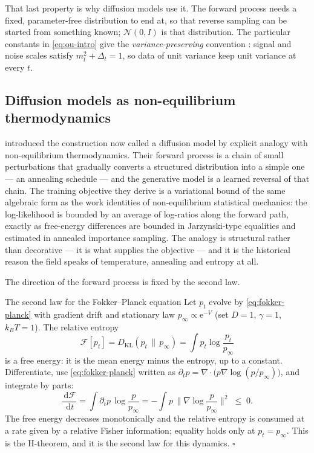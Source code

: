 \documentclass[11pt,a4paper]{article}
\newcommand{\N}{\mathcal{N}}
\newcommand{\KL}{D_{\mathrm{KL}}}
\newcommand{\mt}{m_t}
\newcommand{\Dt}{\Delta_t}
\newcommand{\dd}{\,\mathrm d}
\newcommand{\e}{\mathrm e}
\newcounter{toolbox}
\begin{document}
That last property is why diffusion models use it. The forward process needs a fixed,
parameter-free distribution to end at, so that reverse sampling can be started from something
known; $\N(0,I)$ is that distribution. The particular constants in \eqref{eq:ou-intro} give
the \emph{variance-preserving} convention \citep{song2021scorebased}: signal and noise scales
satisfy $\mt^2+\Dt=1$, so data of unit variance keep unit variance at every $t$.

\subsection{Diffusion models as non-equilibrium thermodynamics}\label{sec:thermo}

\citet{sohl2015deep} introduced the construction now called a diffusion model by explicit
analogy with non-equilibrium thermodynamics. Their forward process is a chain of small
perturbations that gradually converts a structured distribution into a simple one --- an
annealing schedule --- and the generative model is a learned reversal of that chain. The
training objective they derive is a variational bound of the same algebraic form as the work
identities of non-equilibrium statistical mechanics: the log-likelihood is bounded by an
average of log-ratios along the forward path, exactly as free-energy differences are bounded
in Jarzynski-type equalities and estimated in annealed importance sampling. The analogy is
structural rather than decorative --- it is what supplies the objective --- and it is the
historical reason the field speaks of temperature, annealing and entropy at all.

The direction of the forward process is fixed by the second law.

\begin{toolbox}{The second law for the Fokker--Planck equation}\label{tb:second-law}
Let $p_t$ evolve by \eqref{eq:fokker-planck} with gradient drift and stationary law
$p_\infty\propto\e^{-V}$ (set $D=1$, $\gamma=1$, $k_BT=1$). The relative entropy
\begin{equation}
 \mathcal F[p_t]=\KL(p_t\,\|\,p_\infty)=\int p_t\log\frac{p_t}{p_\infty}
\end{equation}
is a free energy: it is the mean energy minus the entropy, up to a constant. Differentiate,
use \eqref{eq:fokker-planck} written as
$\partial_tp=\nabla\cdot\big(p\nabla\log(p/p_\infty)\big)$, and integrate by parts:
\begin{equation}
 \frac{\dd\mathcal F}{\dd t}
 =\int\partial_tp\,\log\frac{p}{p_\infty}
 =-\int p\,\Big\|\nabla\log\frac{p}{p_\infty}\Big\|^2
 \;\le\;0 .
 \label{eq:h-theorem}
\end{equation}
The free energy decreases monotonically and the relative entropy is consumed at a rate given
by a relative Fisher information; equality holds only at $p_t=p_\infty$. This is the
H-theorem, and it is the second law for this dynamics. \hfill$\square$
\end{toolbox}
\end{document}
